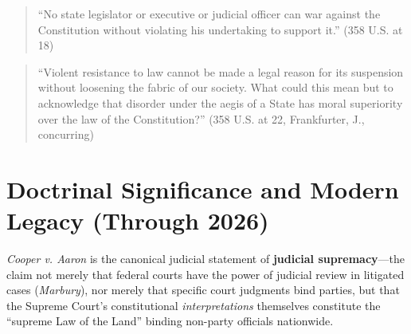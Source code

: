 \documentclass[12pt]{article}
\begin{document}
\begin{quote}
``No state legislator or executive or judicial officer can war against the Constitution without violating his undertaking to support it.'' (358 U.S. at 18)
\end{quote}

\begin{quote}
``Violent resistance to law cannot be made a legal reason for its suspension without loosening the fabric of our society. What could this mean but to acknowledge that disorder under the aegis of a State has moral superiority over the law of the Constitution?'' (358 U.S. at 22, Frankfurter, J., concurring)
\end{quote}

\section{Doctrinal Significance and Modern Legacy (Through 2026)}
\textit{Cooper v. Aaron} is the canonical judicial statement of \textbf{judicial supremacy}---the claim not merely that federal courts have the power of judicial review in litigated cases (\textit{Marbury}), nor merely that specific court judgments bind parties, but that the Supreme Court's constitutional \emph{interpretations} themselves constitute the ``supreme Law of the Land'' binding non-party officials nationwide.
\end{document}
